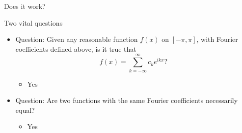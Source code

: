 \begin{frame}{Does it work?}

\begin{block}{Two vital questions}

\begin{itemize}
\item
  Question: Given any reasonable function $f(x)$ on
  $\left[-\pi,\pi\right]$, with Fourier coefficients defined above, is
  it true that \[f(x) = \sum_{k=-\infty}^{\infty}c_{k}e^{ikx}?\]

  \begin{itemize}
  \itemsep1pt\parskip0pt
  \item
    Yes
  \end{itemize}
\item
  Question: Are two functions with the same Fourier coefficients
  necessarily equal?

  \begin{itemize}
  \itemsep1pt\parskip0pt
  \item
    Yes
  \end{itemize}
\end{itemize}

\end{block}

\end{frame}

